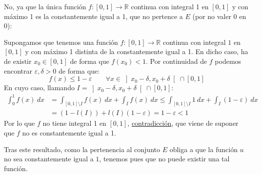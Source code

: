 \begin{ejercicio}
\begin{enumerate}[label=\alph*)]
            No, ya que la única función $f:[0,1]\to \mathbb{R}$ continua con integral 1 en $[0,1]$ y con máximo 1 es la constantemente igual a 1, que no pertence a $E$ (por no valer 0 en 0): 

            Supongamos que tenemos una función $f:[0,1]\to \mathbb{R}$ continua con integral $1$ en $[0,1]$ y con máximo 1 distinta de la constantemente igual a 1. En dicho caso, ha de existir $x_0\in [0,1]$ de forma que $f(x_0) < 1$. Por continuidad de $f$ podemos encontrar $\varepsilon,\delta>0$ de forma que:
            \begin{equation*}
                f(x) \leq 1 -\varepsilon \qquad \forall x\in \left]x_0-\delta,x_0+\delta\right[\cap [0,1]
            \end{equation*}
            En cuyo caso, llamando $I = \left]x_0-\delta,x_0+\delta\right[\cap [0,1]$:
            \begin{align*}
                \int_{0}^{1} f(x)~dx &= \int_{[0,1]\setminus I} f(x)~dx + \int_I f(x)~dx \leq \int_{[0,1]\setminus I} 1~dx + \int_I (1-\varepsilon)~dx \\ &= (1-l(I)) + l(I)(1-\varepsilon) = 1-\varepsilon < 1
            \end{align*}
            Por lo que $f$ no tiene integral 1 en $[0,1]$, \underline{contradicción}, que viene de suponer que $f$ no es constantemente igual a 1. 

            Tras este resultado, como la pertenencia al conjunto $E$ obliga a que la función $u$ no sea constantemente igual a $1$, tenemos pues que no puede existir una tal función.
    \end{enumerate}
\end{ejercicio}

